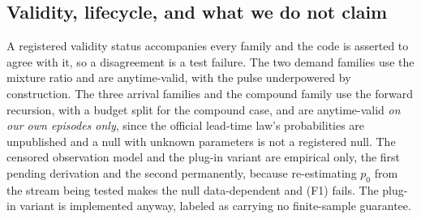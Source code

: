 \subsection{Validity, lifecycle, and what we do not claim}
\label{sec:notclaim}

A registered validity status accompanies every family and the code is asserted to
agree with it, so a disagreement is a test failure. The two demand families use
the mixture ratio and are anytime-valid, with the pulse underpowered by
construction. The three arrival families and the compound family use the forward
recursion, with a budget split for the compound case, and are anytime-valid
\emph{on our own episodes only}, since the official lead-time law's probabilities
are unpublished and a null with unknown parameters is not a registered null. The
censored observation model and the plug-in variant are empirical only, the first
pending derivation and the second permanently, because re-estimating $p_0$ from
the stream being tested makes the null data-dependent and (F1) fails. The plug-in
variant is implemented anyway, labeled as carrying no finite-sample guarantee.


